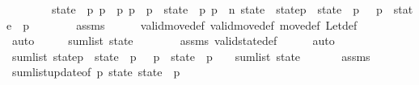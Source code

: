 \begin{isabellebody}
\ \ \ \ \ {\isacharasterisk}{\isacharcolon}\ {\isachardoublequoteopen}{}\ {\isacharless}\ state\ {\isacharbang}\ p{}{\isachardoublequoteclose}\ {\isachardoublequoteopen}p{}\ {\isacharless}\ p{}{\isachardoublequoteclose}\ {\isachardoublequoteopen}p{}\ {\isasymle}\ p{}\ {\isacharplus}\ state\ {\isacharbang}\ p{}{\isachardoublequoteclose}\ {\isachardoublequoteopen}p{}\ {\isasymle}\ n{\isachardoublequoteclose}\ {\isachardoublequoteopen}state{\isacharprime}\ {\isacharequal}\ state{\isacharbrackleft}p{}\ {\isacharcolon}{\isacharequal}\ state\ {\isacharbang}\ p{}\ {\isacharminus}\ {}{\isacharcomma}\ p{}\ {\isacharcolon}{\isacharequal}\ state\ {\isacharbang}\ p{}\ {\isacharplus}\ {}{\isacharbrackright}{\isachardoublequoteclose}\isanewline
\ \ \ \ \isamarkupfalse%
\ assms\isanewline
\ \ \ \ \isamarkupfalse%
\ valid{\isacharunderscore}move{\isacharunderscore}def\ valid{\isacharunderscore}move{\isacharprime}{\isacharunderscore}def\ move{\isacharunderscore}def\ Let{\isacharunderscore}def\isanewline
\ \ \ \ \isamarkupfalse%
\ auto\isanewline
\ \ \isamarkupfalse%
\ \isamarkupfalse%
\ {\isachardoublequoteopen}sum{\isacharunderscore}list\ state\ {\isachargreater}\ {}{\isachardoublequoteclose}\isanewline
\ \ \ \ \isamarkupfalse%
\ assms{\isacharparenleft}{}{\isacharparenright}\ valid{\isacharunderscore}state{\isacharunderscore}def\isanewline
\ \ \ \ \isamarkupfalse%
\ auto\isanewline
\ \ \isamarkupfalse%
\ {\isachardoublequoteopen}sum{\isacharunderscore}list\ {\isacharparenleft}state{\isacharbrackleft}p{}\ {\isacharcolon}{\isacharequal}\ state\ {\isacharbang}\ p{}\ {\isacharminus}\ {}{\isacharcomma}\ p{}\ {\isacharcolon}{\isacharequal}\ state\ {\isacharbang}\ p{}\ {\isacharplus}\ {}{\isacharbrackright}{\isacharparenright}\ {\isacharequal}\ sum{\isacharunderscore}list\ state{\isachardoublequoteclose}\isanewline
\ \ \ \ \isamarkupfalse%
\ {\isacharasterisk}\ assms\isanewline
\ \ \ \ \isamarkupfalse%
\ sum{\isacharunderscore}list{\isacharunderscore}update{\isacharbrackleft}of\ p{}\ state\ {\isachardoublequoteopen}state\ {\isacharbang}\ p{}\ {\isacharminus}\ {}{\isachardoublequoteclose}{\isacharbrackright}\isanewline

\end{isabellebody}
